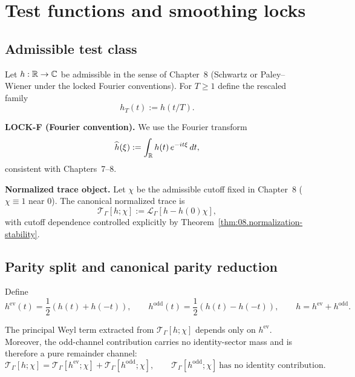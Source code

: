 \section{Test functions and smoothing locks}
\label{sec:09.tests}

\subsection{Admissible test class}\label{subsec:09.admissible-smoothing}

Let $h:\mathbb{R}\to\mathbb{C}$ be admissible in the sense of Chapter~8 (Schwartz or Paley--Wiener under the locked Fourier conventions).
For $T\ge1$ define the rescaled family
\begin{equation}\label{eq:09.rescale}
h_T(t):=h(t/T).
\end{equation}

\medskip
\noindent\textbf{LOCK-F (Fourier convention).}
We use the Fourier transform
\begin{equation}\label{eq:09.FT}
\widehat h(\xi):=\int_{\mathbb{R}} h(t)\,e^{-it\xi}\,dt,
\end{equation}
consistent with Chapters~7--8.

\medskip
\noindent\textbf{Normalized trace object.}
Let $\chi$ be the admissible cutoff fixed in Chapter~8 ($\chi\equiv1$ near $0$). The canonical normalized trace is
\begin{equation}\label{eq:09.T.def}
\mathcal T_\Gamma[h;\chi]:=\mathcal L_\Gamma[h-h(0)\chi],
\end{equation}
with cutoff dependence controlled explicitly by Theorem~\ref{thm:08.normalization-stability}.

\subsection{Parity split and canonical parity reduction}\label{subsec:09.parity}

Define
\[
h^{\mathrm{ev}}(t)=\frac12(h(t)+h(-t)),
\qquad
h^{\mathrm{odd}}(t)=\frac12(h(t)-h(-t)),
\qquad h=h^{\mathrm{ev}}+h^{\mathrm{odd}}.
\]

\begin{lemma}\label{lem:09.parity-reduction}
The principal Weyl term extracted from $\mathcal T_\Gamma[h;\chi]$ depends only on $h^{\mathrm{ev}}$.
Moreover, the odd-channel contribution carries no identity-sector mass and is therefore a pure remainder channel:
\[
\mathcal T_\Gamma[h;\chi]=\mathcal T_\Gamma[h^{\mathrm{ev}};\chi]+\mathcal T_\Gamma[h^{\mathrm{odd}};\chi],
\qquad
\mathcal T_\Gamma[h^{\mathrm{odd}};\chi]\ \text{has no identity contribution}.
\]
\end{lemma}

